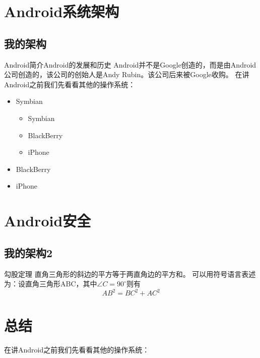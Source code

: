 \documentclass{beamer}
\begin{document}
\makeTitlePage


\section{Android系统架构}  
\subsection{我的架构}

\begin{frame}{Android简介}{Android的发展和历史}  
Android并不是Google创造的，而是由Android公司创造的，该公司的创始人是Andy Rubin。该公司后来被Google收购。  
在讲Android之前我们先看看其他的操作系统：  
\begin{itemize}  
\item Symbian  
\begin{itemize}  
\item Symbian  
\item BlackBerry  
\item iPhone
\end{itemize}  
\item BlackBerry  
\item iPhone
\end{itemize}  
\end{frame}  

\section{Android安全} 
\subsection{我的架构2}
\begin{frame}  
\begin{block}{勾股定理}  
直角三角形的斜边的平方等于两直角边的平方和。  
可以用符号语言表述为：设直角三角形ABC，其中$\angle C=90^\circ$则有  
\begin{equation}  
AB^2=BC^2+AC^2  
\end{equation}  
\end{block}  
\end{frame}

  
\section{总结}
\begin{frame}
  在讲Android之前我们先看看其他的操作系统：  
\end{frame}  
\end{document}
